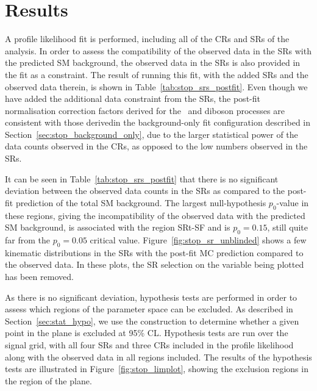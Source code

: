 \section{Results}
\label{sec:stop_results}


A profile likelihood fit is performed, including all of the CRs and SRs of the analysis.
In order to assess the compatibility of the observed data in the SRs with the predicted
SM background, the observed data in the SRs is also provided in the fit as a constraint.
The result of running this fit, with the added SRs and the observed data therein,
is shown in Table~\ref{tab:stop_srs_postfit}.
Even though we have added the additional data constraint from the SRs, the post-fit normalisation
correction factors derived for the \ttbar~and diboson processes are consistent
with those derivedin the background-only fit configuration described in Section~\ref{sec:stop_background_only},
due to the larger statistical power of the data counts observed in the CRs, as opposed to the low numbers
observed in the SRs.

It can be seen in Table~\ref{tab:stop_srs_postfit} that there is no significant deviation
between the observed data counts in the SRs as compared to the post-fit prediction of the total SM
background.
The largest null-hypothesis $p_0$-value in these regions, giving the incompatibility of the observed
data with the predicted SM background, is associated with the region SRt-SF and is $p_0 = 0.15$, still
quite far from the $p_0 = 0.05$ critical value.
Figure~\ref{fig:stop_sr_unblinded} shows a few kinematic distributions in the SRs with the post-fit
MC prediction compared to the observed data.
In these plots, the SR selection on the variable being plotted has been removed.

As there is no significant deviation, hypothesis tests are performed in order to assess which regions
of the \bWN parameter space can be excluded.
As described in Section~\ref{sec:stat_hypo}, we use the \cls construction to determine whether
a given point in the \msn plane is excluded at 95\% CL.
Hypothesis tests are run over the \bWN signal grid, with all four SRs and three CRs included in the profile
likelihood along with the observed data in all regions included.
The results of the hypothesis tests are illustrated in Figure~\ref{fig:stop_limplot}, showing the
exclusion regions in the \bWN region of the \msn plane.

